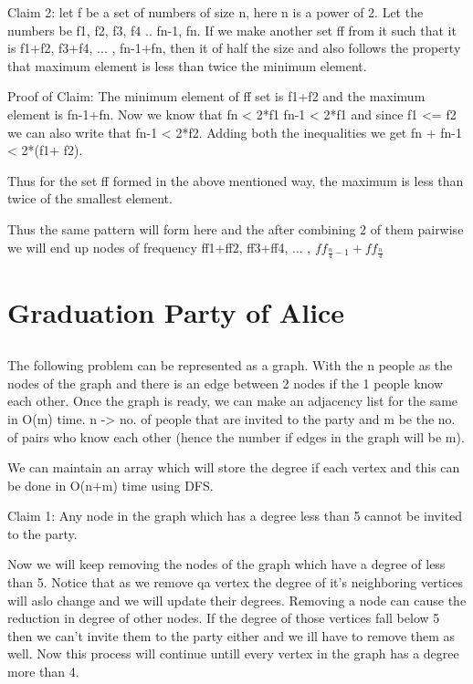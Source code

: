 \documentclass{article}
\begin{document}
Claim 2: let f be a set of numbers of size n, here n is a power of 2. Let the numbers be f1, f2, f3, f4 .. fn-1, fn. If we make another set ff from it such that it is f1+f2, f3+f4, ... ,  fn-1+fn, then it of half the size and also follows the property that maximum element is less than twice the minimum element. 

Proof of Claim: The minimum element of ff set is f1+f2 and the maximum element is fn-1+fn. Now we know that 
fn < 2*f1
fn-1 < 2*f1
and since f1 <= f2 we can also write that fn-1 < 2*f2.
Adding both the inequalities we get fn + fn-1 < 2*(f1+ f2).

Thus for the set ff formed in the above mentioned way, the maximum is less than twice of the smallest element. 

Thus the same pattern will form here and the after combining 2 of them pairwise we will end up nodes of frequency ff1+ff2, ff3+ff4, ... , $ff_{\frac{n}{4}-1}+ff_{\frac{n}{4}}$

\section{Graduation Party of Alice}

\subsection{}
The following problem can be represented as a graph. With the n people as the nodes of the graph and there is an edge between 2 nodes if the 1 people know each other. Once the graph is ready, we can make an adjacency list for the same in O(m) time. n -> no. of people that are invited to the party and m be the no. of pairs who know each other (hence the number if edges in the graph will be m).

We can maintain an array which will store the degree if each vertex and this can be done in O(n+m) time using DFS.

Claim 1: Any node in the graph which has a degree less than 5 cannot be invited to the party. 

Now we will keep removing the nodes of the graph which have a degree of less than 5. Notice that as we remove qa vertex the degree of it's neighboring vertices will aslo change and we will update their degrees. Removing a node can cause the reduction in degree of other nodes. If the degree of those vertices fall below 5 then we can't invite them to the party either and we ill have to remove them as well. Now this process will continue untill every vertex in the graph has a degree more than 4.
\end{document}
